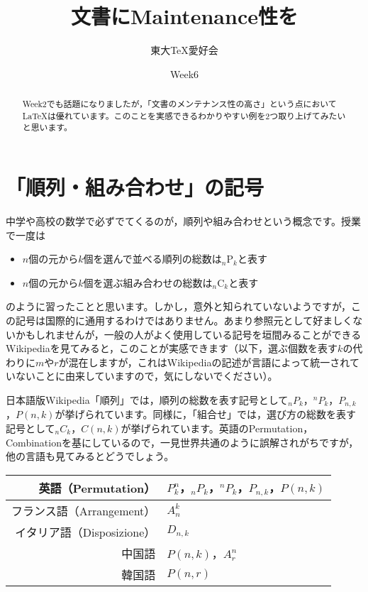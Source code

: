 \documentclass[autodetect-engine,dvipdfmx]{jsarticle}
\title{文書にMaintenance性を}
\author{東大TeX愛好会}
\date{Week6}
\begin{document}
\maketitle

\begin{abstract}
Week2でも話題になりましたが，「文書のメンテナンス性の高さ」という点において\LaTeX は優れています。このことを実感できるわかりやすい例を2つ取り上げてみたいと思います。
\end{abstract}

\part{「順列・組み合わせ」の記号}

中学や高校の数学で必ずでてくるのが，順列や組み合わせという概念です。授業で一度は

\begin{itemize}
\item $n$個の元から$k$個を選んで並べる順列の総数は$_{n}\mathrm{P}_{k}$と表す
\item $n$個の元から$k$個を選ぶ組み合わせの総数は$_{n}\mathrm{C}_{k}$と表す
\end{itemize}

のように習ったことと思います。しかし，意外と知られていないようですが，この記号は国際的に通用するわけではありません。あまり参照元として好ましくないかもしれませんが，一般の人がよく使用している記号を垣間みることができるWikipediaを見てみると，このことが実感できます（以下，選ぶ個数を表す$k$の代わりに$m$や$r$が混在しますが，これはWikipediaの記述が言語によって統一されていないことに由来していますので，気にしないでください）。

日本語版Wikipedia「順列」では，順列の総数を表す記号として$_{n}P_{k}$，$^{n}P_{k}$，$P_{n,k}$，$P(n,k)$が挙げられています。同様に，「組合せ」では，選び方の総数を表す記号として$_{n}C_{k}$，$C(n,k)$が挙げられています。英語のPermutation，Combinationを基にしているので，一見世界共通のように誤解されがちですが，他の言語も見てみるとどうでしょう。

\begin{table}[h]

\centering

\begin{tabular}{rl}
\hline
英語（Permutation）&$P_{k}^{n}$，$_{n}P_{k}$，$^{n}P_{k}$，$P_{n,k}$，$P(n,k)$\\\hline
フランス語（Arrangement）&$A_{n}^{k}$\\\hline
イタリア語（Disposizione）&$D_{n,k}$\\\hline
中国語&$P(n,k)$，$A_{r}^{n}$\\\hline
韓国語&$P(n,r)$\\\hline
\end{tabular}

\end{table}
\end{document}
